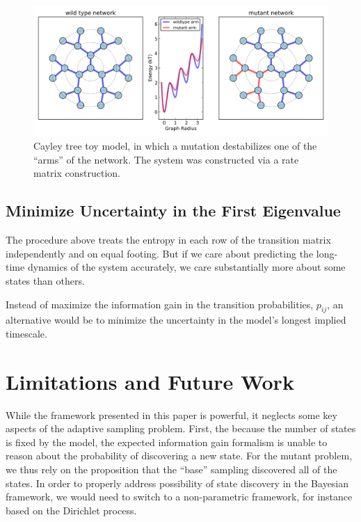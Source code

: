 \documentclass[twocolumn,floatfix,nofootinbib,aps]{revtex4-1}
\begin{document}
\begin{figure}[h]
\centering
\includegraphics[width=7in]{../code/cayleytree/figures/cayley.png}
\caption{Cayley tree toy model, in which a mutation destabilizes one of the ``arms'' of the network. The system was constructed via a rate matrix construction.}
\end{figure}

\subsection{Minimize Uncertainty in the First Eigenvalue}

The procedure above treats the entropy in each row of the transition matrix independently and on equal footing. But if we care about predicting the long-time dynamics of the system accurately, we care substantially more about some states than others.

Instead of maximize the information gain in the transition probabilities, $p_{ij}$, an alternative would be to minimize the uncertainty in the model's longest implied timescale.

\section{Limitations and Future Work}
While the framework presented in this paper is powerful, it neglects some key aspects of the adaptive sampling problem. First, the because the number of states is fixed by the model, the expected information gain formalism is unable to reason about the probability of discovering a new state. For the mutant problem, we thus rely on the proposition that the ``base'' sampling discovered all of the states. In order to properly address possibility of state discovery in the Bayesian framework, we would need to switch to a non-parametric framework, for instance based on the Dirichlet process.
\end{document}
